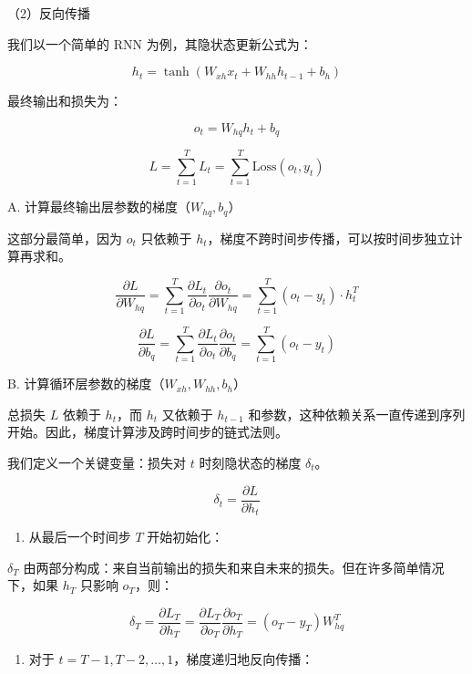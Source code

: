 （2）反向传播

我们以一个简单的 RNN 为例，其隐状态更新公式为：

\[
h_t = \tanh(W_{xh}x_t + W_{hh}h_{t-1} + b_h)
\]

最终输出和损失为：

\[
o_t = W_{hq}h_t + b_q
\]

\[
L = \sum_{t=1}^{T} L_t = \sum_{t=1}^{T} \mathrm{Loss}(o_t, y_t)
\]

A. 计算最终输出层参数的梯度（\(W_{hq}, b_q\)）

这部分最简单，因为 \(o_t\) 只依赖于 \(h_t\)，梯度不跨时间步传播，可以按时间步独立计算再求和。

\[
\frac{\partial L}{\partial W_{hq}}
= \sum_{t=1}^{T} \frac{\partial L_t}{\partial o_t}\frac{\partial o_t}{\partial W_{hq}}
= \sum_{t=1}^{T}(o_t - y_t) \cdot h_t^T
\]

\[
\frac{\partial L}{\partial b_q}
= \sum_{t=1}^{T} \frac{\partial L_t}{\partial o_t}\frac{\partial o_t}{\partial b_q}
= \sum_{t=1}^{T}(o_t - y_t)
\]

B. 计算循环层参数的梯度（\(W_{xh}, W_{hh}, b_h\)）

总损失 \(L\) 依赖于 \(h_t\)，而 \(h_t\) 又依赖于 \(h_{t-1}\) 和参数，这种依赖关系一直传递到序列开始。因此，梯度计算涉及跨时间步的链式法则。

我们定义一个关键变量：损失对 \(t\) 时刻隐状态的梯度 \(\delta_t\)。

\[
\delta_t = \frac{\partial L}{\partial h_t}
\]

\begin{enumerate}
\def\labelenumi{\arabic{enumi}.}
\tightlist
\item
{}
  从最后一个时间步 \(T\) 开始初始化：
\end{enumerate}

\(\delta_T\) 由两部分构成：来自当前输出的损失和来自未来的损失。但在许多简单情况下，如果 \(h_T\) 只影响 \(o_T\)，则：

\[
\delta_T = \frac{\partial L_T}{\partial h_T}
= \frac{\partial L_T}{\partial o_T}\frac{\partial o_T}{\partial h_T}
= (o_T - y_T) W_{hq}^T
\]

\begin{enumerate}
\def\labelenumi{\arabic{enumi}.}
\setcounter{enumi}{1}
\tightlist
\item
{}
  对于 \(t = T-1, T-2, \ldots, 1\)，梯度递归地反向传播：
\end{enumerate}

